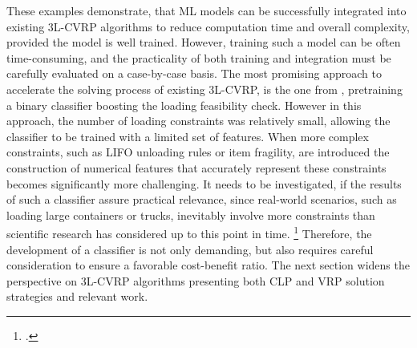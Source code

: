 \parbreak

These examples demonstrate, that \gls{ML} models can be successfully integrated into existing \gls{3L-CVRP}
algorithms to reduce computation time and overall complexity, provided the model is well trained.
However, training such a model can be often time-consuming, and the practicality of both training and
integration must be carefully evaluated on a case-by-case basis. The most promising approach to
accelerate the solving process of existing \gls{3L-CVRP}, is the one from \cite{zhang_learning-based_2022},
pretraining a binary classifier boosting the loading feasibility check. However in this approach,
the number of loading constraints was relatively small, allowing the classifier
to be trained with a limited set of features. When more complex constraints, such as
\gls{LIFO} unloading rules or item fragility, are introduced the construction of numerical features that accurately
represent these constraints becomes significantly more challenging. It needs to be investigated, if
the results of such a classifier assure practical relevance, since real-world
scenarios, such as loading large containers or trucks, inevitably involve
more constraints than scientific research has considered up to this point in time. \footcite[cf.][p. 1f]{bischoff_issues_1995}
Therefore, the development of a classifier is not only demanding, but also
requires careful consideration to ensure a favorable cost-benefit ratio. The next section widens the perspective
on \gls{3L-CVRP} algorithms presenting both \gls{CLP} and \gls{VRP} solution strategies and relevant work.

